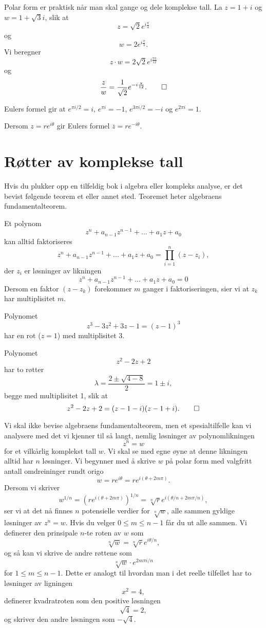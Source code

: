 \begin{ex}
Polar form er praktisk når man skal gange og dele komplekse tall. 
La $z=1+i$ og $w=1+\sqrt{3}i$, slik at
\[
z=\sqrt{2}e^{i\frac{\pi}{4}}
\]
og 
\[
w=2e^{i\frac{\pi}{3}}.
\]
Vi beregner
\[
z\cdot w=2\sqrt{2}e^{i\frac{7\pi}{12}}
\]
og
\[
\frac{z}{w}=\frac{1}{\sqrt{2}}e^{-i\frac{\pi}{12}}. \qedhere
\]
\end{ex}

\begin{ex}
Eulers formel gir at $e^{ \pi i/2 }=i$, $e^{\pi i}=-1$, $e^{3\pi i/2 }=-i$ og $e^{2 \pi i}=1$.
\end{ex}

\begin{ex}
Dersom $z=re^{i\theta}$ gir Eulers formel $\overline z=re^{-i\theta}$.
\end{ex}

\section*{Røtter av komplekse tall}
Hvis du plukker opp en tilfeldig bok i algebra eller kompleks analyse, 
er det bevist følgende teorem et eller annet sted. 
Teoremet heter algebraens fundamentalteorem.
\begin{thm}
Et polynom
\[
z^n+a_{n-1}z^{n-1}+...+a_1z+a_0
\]
kan alltid faktoriseres
\[
z^n+a_{n-1}z^{n-1}+...+a_1z+a_0= \prod_{i=1}^n (z-z_i),
\]
der $z_i$ er løsninger av likningen
\[
z^n+a_{n-1}z^{n-1}+...+a_1z+a_0=0
\]
Dersom en faktor $(z-z_k)$  forekommer $m$ ganger i faktoriseringen, 
sier vi at $z_k$ har multiplisitet $m$.
\end{thm}

\begin{ex}
Polynomet 
\[
z^3-3z^2+3z-1=(z-1)^3
\]
har en rot ($z=1$) med multiplisitet 3.
\end{ex}

\begin{ex}
Polynomet 
\[
z^2-2z+2
\]
har to røtter 
\[
\lambda=\frac{2\pm\sqrt{4-8}}{2}=1\pm i,
\] 
begge med multiplisitet 1, slik at 
\[
z^2-2z+2=(z-1-i)(z-1+i).\qedhere
\]
\end{ex}


Vi skal ikke bevise algebraens fundamentalteorem,
men et spesialtilfelle kan vi analysere med det vi kjenner til så langt, 
nemlig løsninger av polynomlikningen
\[
z^n=w
\]
for et vilkårlig komplekst tall $w$. 
Vi skal se med egne øyne at denne likningen alltid har $n$ løsninger. 
Vi begynner med å skrive $w$ på polar form med valgfritt antall omdreininger rundt origo
\[
w = re^{i \theta}=re^{i (\theta+2m\pi)}.
\]
Dersom vi skriver 
\[
w^{1/n} = (re^{i (\theta+2m\pi)})^{1/n}=\sqrt[n]{r}e^{i (\theta/n+2m\pi/n)},
\]
ser vi at det nå finnes $n$ potensielle verdier for $\sqrt[n]{w}$, alle sammen gyldige løsninger av $z^n=w$. 
Hvis du velger $0\leq m \leq n-1$ får du ut alle sammen. 
Vi definerer den prinsipale $n$-te roten av $w$ som
\[
\sqrt[n]{w} = \sqrt[n]{r}e^{i \theta/n},
\]
og så kan vi skrive de andre røttene som 
\[
\sqrt[n]{w} \cdot e^{2m\pi i/n}
\]
for $1 \leq m\leq n-1$.
Dette er analogt til hvordan man i det reelle tilfellet har to løsninger av ligningen
\[
x^2=4,
\]
definerer kvadratroten som den positive løsningen
\[
\sqrt{4}=2,
\]
og skriver den andre løsningen som $-\sqrt{4}$.


